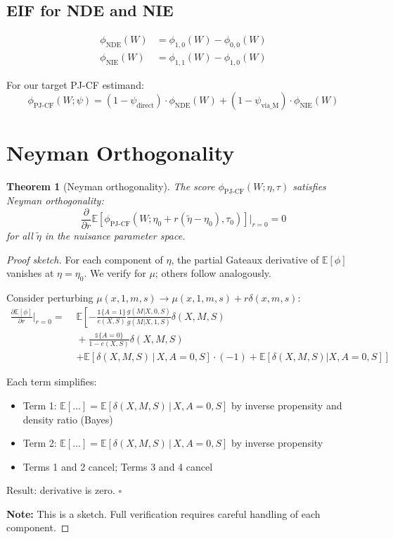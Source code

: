 \documentclass[11pt]{article}
\theoremstyle{plain}
\newtheorem{theorem}{Theorem}
\theoremstyle{definition}
\theoremstyle{remark}
\newcommand{\E}{\mathbb{E}}
\newcommand{\given}{\,|\,}
\newcommand{\ind}{\mathbb{1}}
\begin{document}
\subsection{EIF for NDE and NIE}

\begin{align}
    \phi_{\text{NDE}}(W) &= \phi_{1,0}(W) - \phi_{0,0}(W) \\
    \phi_{\text{NIE}}(W) &= \phi_{1,1}(W) - \phi_{1,0}(W)
\end{align}

For our target PJ-CF estimand:
\begin{equation}
    \phi_{\text{PJ-CF}}(W; \psi) = (1 - \psi_{\text{direct}}) \cdot \phi_{\text{NDE}}(W) + (1 - \psi_{\text{via\_M}}) \cdot \phi_{\text{NIE}}(W)
\end{equation}

\section{Neyman Orthogonality}
\label{sec:orthogonality}

\begin{theorem}[Neyman orthogonality]
\label{thm:orthogonality}
The score $\phi_{\text{PJ-CF}}(W; \eta, \tau)$ satisfies Neyman orthogonality:
\begin{equation}
    \frac{\partial}{\partial r} \E[\phi_{\text{PJ-CF}}(W; \eta_0 + r(\tilde\eta - \eta_0), \tau_0)] \Big|_{r=0} = 0
\end{equation}
for all $\tilde\eta$ in the nuisance parameter space.
\end{theorem}

\begin{proof}[Proof sketch]
For each component of $\eta$, the partial Gateaux derivative of $\E[\phi]$ vanishes at $\eta = \eta_0$. We verify for $\mu$; others follow analogously.

Consider perturbing $\mu(x, 1, m, s) \to \mu(x, 1, m, s) + r \delta(x, m, s)$:
\begin{align}
    \frac{\partial \E[\phi]}{\partial r}\Big|_{r=0} =\,&\, \E\!\left[ -\frac{\ind\{A=1\}}{e(X,S)} \frac{g(M|X,0,S)}{g(M|X,1,S)} \delta(X, M, S) \right.\\
    &\,+\frac{\ind\{A=0\}}{1-e(X,S)}\delta(X, M, S) \\
    &\,\left. + \E\![\delta(X, M, S) \given X, A=0, S] \cdot (-1) + \E[\delta(X,M,S) | X, A=0, S] \right]
\end{align}

Each term simplifies:
\begin{itemize}
    \item Term 1: $\E[\ldots] = \E\![\delta(X, M, S) \given X, A=0, S]$ by inverse propensity and density ratio (Bayes)
    \item Term 2: $\E[\ldots] = \E\![\delta(X, M, S) \given X, A=0, S]$ by inverse propensity
    \item Terms 1 and 2 cancel; Terms 3 and 4 cancel
\end{itemize}

Result: derivative is zero. $\square$

\textbf{Note:} This is a sketch. Full verification requires careful handling of each component.
\end{proof}
\end{document}

